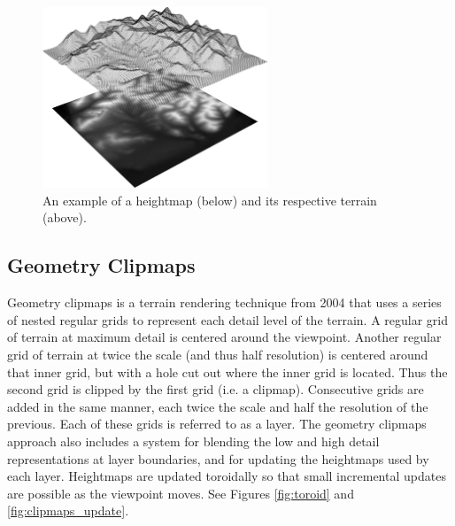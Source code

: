 \begin{figure}
	\centering
		\includegraphics[width=0.6\textwidth]{figures/hm1.png}
	\caption{An example of a heightmap (below) and its respective terrain (above).}
	\label{fig:hm}
\end{figure}

\subsection{Geometry Clipmaps}

Geometry clipmaps is a terrain rendering technique from 2004 that uses a series of nested regular grids to represent each detail level of the terrain. \cite{geometry_clipmaps}
A regular grid of terrain at maximum detail is centered around the viewpoint.
Another regular grid of terrain at twice the scale (and thus half resolution) is centered around that inner grid, but with a hole cut out where the inner grid is located.
Thus the second grid is clipped by the first grid (i.e. a clipmap).
Consecutive grids are added in the same manner, each twice the scale and half the resolution of the previous.
Each of these grids is referred to as a layer.
The geometry clipmaps approach also includes a system for blending the low and high detail representations at layer boundaries, and for updating the heightmaps used by each layer.
Heightmaps are updated toroidally so that small incremental updates are possible as the viewpoint moves.
See Figures \ref{fig:toroid} and \ref{fig:clipmaps_update}.

